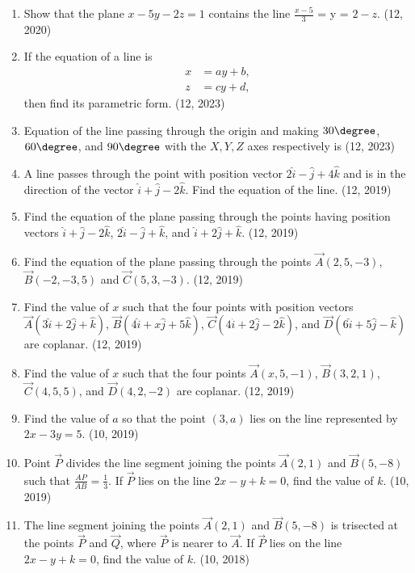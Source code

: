 \begin{enumerate}[label=\thesubsection.\arabic*, ref=\thesubsection.\theenumi]
\item Show that the plane $x - 5y - 2z = 1$ contains the line $\frac{x - 5}{3}$ = y = $2 -z$.
\hfill (12, 2020)
    \item If the equation of a line is
    \begin{align*}
        x &= ay + b, \\
        z &= cy + d,
    \end{align*}
    then find its parametric form.
    \hfill (12, 2023)
    \item Equation of the line passing through the origin and making $30\degree$, $60\degree$, and $90\degree$ with the $X, Y, Z$ axes respectively is
    \hfill (12, 2023)
	\item A line passes through the point with position vector $2\hat{i} - \hat{j} + 4\hat{k}$ and is in the direction of the vector $\hat{i} + \hat{j} - 2\hat{k}$. Find the equation of the line. \hfill (12, 2019)
	\item Find the equation of the plane passing through the points having position vectors $\hat{i} + \hat{j} - 2\hat{k}$, $2\hat{i} - \hat{j} + \hat{k}$, and $\hat{i} + 2\hat{j} + \hat{k}$. (12, 2019)
	\item Find the equation of the plane passing through the points $\vec{A}(2, 5, -3)$, $\vec{B}(-2, -3, 5)$ and $\vec{C}(5, 3, -3)$. \hfill (12, 2019)
	\item Find the value of $x$ such that the four points with position vectors $\vec{A}(3\hat{i} + 2\hat{j} + \hat{k})$, $\vec{B}(4\hat{i} + x\hat{j} + 5\hat{k})$, $\vec{C}(4\hat{i} + 2\hat{j} - 2\hat{k})$, and $\vec{D}(6\hat{i} + 5\hat{j} - \hat{k})$ are coplanar. \hfill (12, 2019)
	\item Find the value of $x$ such that the four points $\vec{A}(x, 5, -1)$, $\vec{B}(3, 2, 1)$, $\vec{C}(4, 5, 5)$, and $\vec{D}(4, 2, -2)$ are coplanar. \hfill (12, 2019)
\item Find the value of $a$ so that the point $(3, a)$ lies on the line represented by $2x - 3y = 5$. \hfill (10, 2019)
\item Point $\vec{P}$ divides the line segment joining the points $\vec{A}(2, 1)$ and $\vec{B}(5, -8)$ such that $\frac{AP}{AB} = \frac{1}{3}$. If $\vec{P}$ lies on the line $2x - y + k = 0$, find the value of $k$. \hfill (10, 2019)
    \item The line segment joining the points $\vec{A}(2,1)$ and $\vec{B}(5,-8)$ is trisected at the points $\vec{P}$ and $\vec{Q}$, where $\vec{P}$ is nearer to $\vec{A}$. If $\vec{P}$ lies on the line $2x - y + k = 0$, find the value of $k$. \hfill (10, 2018)

\end{enumerate}

